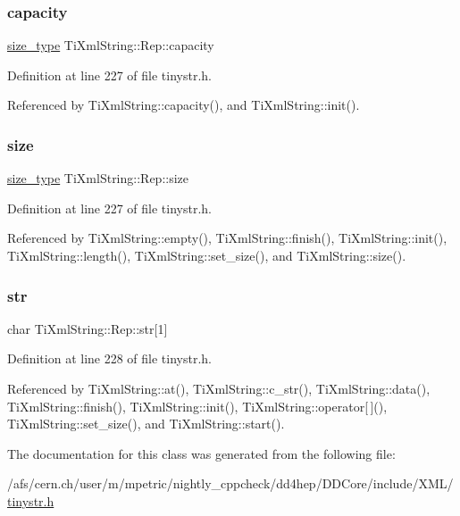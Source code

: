 \subsubsection{\texorpdfstring{capacity}{capacity}}
{\footnotesize\ttfamily \hyperlink{class_ti_xml_string_abeb2c1893a04c17904f7c06546d0b971}{size\+\_\+type} Ti\+Xml\+String\+::\+Rep\+::capacity}



Definition at line 227 of file tinystr.\+h.



Referenced by Ti\+Xml\+String\+::capacity(), and Ti\+Xml\+String\+::init().

\hypertarget{struct_ti_xml_string_1_1_rep_a3470330fe806a575dbb5909a1b908ac1}{}\label{struct_ti_xml_string_1_1_rep_a3470330fe806a575dbb5909a1b908ac1} 
\subsubsection{\texorpdfstring{size}{size}}
{\footnotesize\ttfamily \hyperlink{class_ti_xml_string_abeb2c1893a04c17904f7c06546d0b971}{size\+\_\+type} Ti\+Xml\+String\+::\+Rep\+::size}



Definition at line 227 of file tinystr.\+h.



Referenced by Ti\+Xml\+String\+::empty(), Ti\+Xml\+String\+::finish(), Ti\+Xml\+String\+::init(), Ti\+Xml\+String\+::length(), Ti\+Xml\+String\+::set\+\_\+size(), and Ti\+Xml\+String\+::size().

\hypertarget{struct_ti_xml_string_1_1_rep_a88a7037a489827ec9e59b008e11342b0}{}\label{struct_ti_xml_string_1_1_rep_a88a7037a489827ec9e59b008e11342b0} 
\subsubsection{\texorpdfstring{str}{str}}
{\footnotesize\ttfamily char Ti\+Xml\+String\+::\+Rep\+::str\mbox{[}1\mbox{]}}



Definition at line 228 of file tinystr.\+h.



Referenced by Ti\+Xml\+String\+::at(), Ti\+Xml\+String\+::c\+\_\+str(), Ti\+Xml\+String\+::data(), Ti\+Xml\+String\+::finish(), Ti\+Xml\+String\+::init(), Ti\+Xml\+String\+::operator\mbox{[}$\,$\mbox{]}(), Ti\+Xml\+String\+::set\+\_\+size(), and Ti\+Xml\+String\+::start().



The documentation for this class was generated from the following file\+:\begin{DoxyCompactItemize}
\item 
/afs/cern.\+ch/user/m/mpetric/nightly\+\_\+cppcheck/dd4hep/\+D\+D\+Core/include/\+X\+M\+L/\hyperlink{tinystr_8h}{tinystr.\+h}\end{DoxyCompactItemize}
